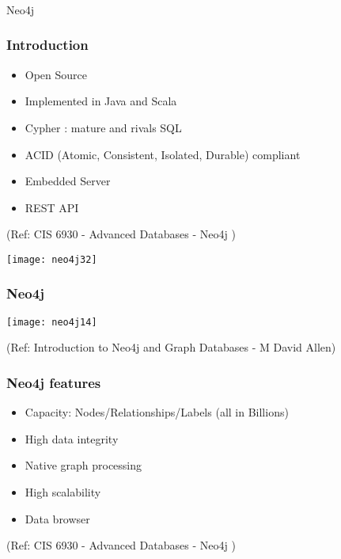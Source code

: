 \begin{frame}[fragile]\frametitle{}
\begin{center}
{\Large Neo4j}
\end{center}
\end{frame}


\begin{frame}\frametitle{Introduction}

\begin{itemize}
\item Open Source
\item Implemented in Java and Scala
\item Cypher : mature and rivals SQL
\item ACID (Atomic, Consistent, Isolated, Durable) compliant
\item Embedded Server
\item REST API
\end{itemize}

{\tiny (Ref: CIS 6930 - Advanced Databases - Neo4j )}


\begin{center}
\texttt{[image: neo4j32]}
\end{center}	

\end{frame}


\begin{frame}[fragile]\frametitle{Neo4j}

\begin{center}
\texttt{[image: neo4j14]}
\end{center}	  

{\tiny (Ref: Introduction to Neo4j and Graph Databases
 - M David Allen)}

\end{frame}

\begin{frame}\frametitle{Neo4j features}

\begin{itemize}
\item Capacity: Nodes/Relationships/Labels (all in Billions)
\item High data integrity
\item Native graph processing
\item High scalability
\item Data browser
\end{itemize}

{\tiny (Ref: CIS 6930 - Advanced Databases - Neo4j )}
\end{frame}


